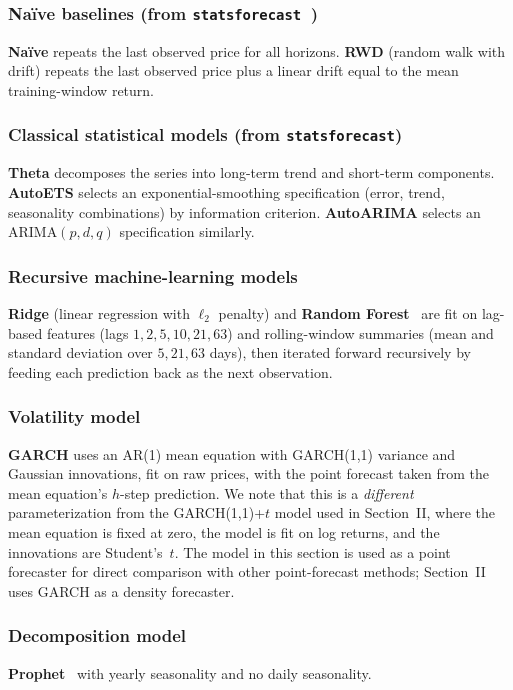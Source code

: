 \documentclass[journal]{IEEEtran}
\begin{document}
\subsubsection{Na\"ive baselines (from \texttt{statsforecast}~\cite{statsforecast})}
\textbf{Na\"ive} repeats the last observed price for all horizons.
\textbf{RWD} (random walk with drift) repeats the last observed price plus
a linear drift equal to the mean training-window return.

\subsubsection{Classical statistical models (from \texttt{statsforecast})}
\textbf{Theta} decomposes the series into long-term trend and short-term
components.  \textbf{AutoETS} selects an exponential-smoothing
specification (error, trend, seasonality combinations) by information
criterion.  \textbf{AutoARIMA} selects an ARIMA$(p,d,q)$ specification
similarly.

\subsubsection{Recursive machine-learning models}
\textbf{Ridge} (linear regression with $\ell_2$ penalty) and
\textbf{Random Forest}~\cite{breiman2001} are fit on lag-based features
(lags $1, 2, 5, 10, 21, 63$) and rolling-window summaries (mean and
standard deviation over $5, 21, 63$ days), then iterated forward recursively
by feeding each prediction back as the next observation.

\subsubsection{Volatility model}
\textbf{GARCH} uses an AR(1) mean equation with GARCH(1,1) variance and
Gaussian innovations, fit on raw prices, with the point forecast taken
from the mean equation's $h$-step prediction.  We note that this is a
\emph{different} parameterization from the GARCH(1,1)+$t$ model used in
Section~II, where the mean equation is fixed at zero, the model is fit on
log returns, and the innovations are Student's~$t$.  The model in this
section is used as a point forecaster for direct comparison with other
point-forecast methods; Section~II uses GARCH as a density forecaster.

\subsubsection{Decomposition model}
\textbf{Prophet}~\cite{taylorletham2018} with yearly seasonality and no
daily seasonality.
\end{document}
